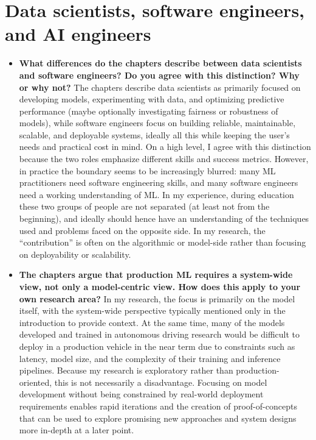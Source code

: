 \documentclass[11pt]{article}
\begin{document}
\section{Data scientists, software engineers, and AI engineers}
\begin{itemize}
\item \textbf{What differences do the chapters describe between data scientists and software engineers? Do you agree with this distinction? Why or why not? }
The chapters describe data scientists as primarily focused on developing models, experimenting with data, and optimizing predictive performance (maybe optionally investigating fairness or robustness of models), while software engineers focus on building reliable, maintainable, scalable, and deployable systems, ideally all this while keeping the user's needs and practical cost in mind. 
On a high level, I agree with this distinction because the two roles emphasize different skills and success metrics. However, in practice the boundary seems to be increasingly blurred: many ML practitioners need software engineering skills, and many software engineers need a working understanding of ML. In my experience, during education these two groups of people are not separated (at least not from the beginning), and ideally should hence have an understanding of the techniques used and problems faced on the opposite side. In my research, the ``contribution'' is often on the algorithmic or model-side rather than focusing on deployability or scalability.

\item \textbf{The chapters argue that production ML requires a system-wide view, not only a model-centric view. How does this apply to your own research area? }
In my research, the focus is primarily on the model itself, with the system-wide perspective typically mentioned only in the introduction to provide context. At the same time, many of the models developed and trained in autonomous driving research would be difficult to deploy in a production vehicle in the near term due to constraints such as latency, model size, and the complexity of their training and inference pipelines. Because my research is exploratory rather than production-oriented, this is not necessarily a disadvantage. Focusing on model development without being constrained by real-world deployment requirements enables rapid iterations and the creation of proof-of-concepts that can be used to explore promising new approaches and system designs more in-depth at a later point.


\end{itemize}
\end{document}
